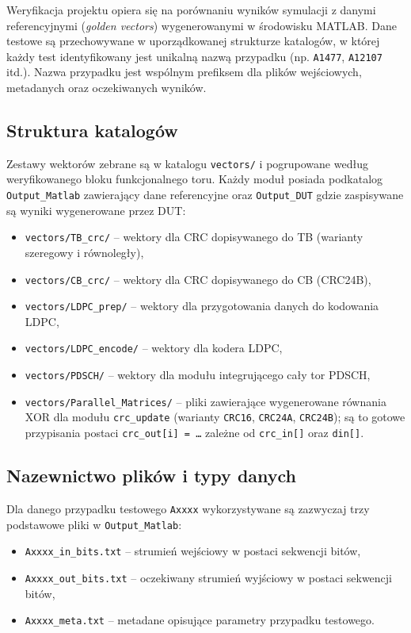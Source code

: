 Weryfikacja projektu opiera się na porównaniu wyników symulacji z danymi referencyjnymi
(\emph{golden vectors}) wygenerowanymi w środowisku MATLAB. Dane testowe są przechowywane
w uporządkowanej strukturze katalogów, w której każdy test identyfikowany jest unikalną nazwą
przypadku (np. \texttt{A1477}, \texttt{A12107} itd.). Nazwa przypadku jest wspólnym prefiksem
dla plików wejściowych, metadanych oraz oczekiwanych wyników.

\subsection{Struktura katalogów}
\label{subsec:wektory_struktura_katalogow}

Zestawy wektorów zebrane są w katalogu \texttt{vectors/} i pogrupowane według weryfikowanego bloku funkcjonalnego toru. Każdy moduł posiada podkatalog \texttt{Output\_Matlab} zawierający dane referencyjne oraz \texttt{Output\_DUT} gdzie zaspisywane są wyniki wygenerowane przez DUT:

\begin{itemize}
    \item \texttt{vectors/TB\_crc/} -- wektory dla CRC dopisywanego do TB (warianty szeregowy i równoległy),
    \item \texttt{vectors/CB\_crc/} -- wektory dla CRC dopisywanego do CB (CRC24B),
    \item \texttt{vectors/LDPC\_prep/} -- wektory dla przygotowania danych do kodowania LDPC,
    \item \texttt{vectors/LDPC\_encode/} -- wektory dla kodera LDPC,
    \item \texttt{vectors/PDSCH/} -- wektory dla modułu integrującego cały tor PDSCH,
    \item \texttt{vectors/Parallel\_Matrices/} -- pliki zawierające wygenerowane równania XOR dla modułu \texttt{crc\_update} (warianty \texttt{CRC16}, \texttt{CRC24A}, \texttt{CRC24B}); są to gotowe przypisania postaci \texttt{crc\_out[i] = \ldots} zależne od \texttt{crc\_in[]} oraz \texttt{din[]}.


\end{itemize}

\subsection{Nazewnictwo plików i typy danych}
\label{subsec:wektory_typy_plikow}

Dla danego przypadku testowego \texttt{Axxxx} wykorzystywane są zazwyczaj trzy podstawowe
pliki w \texttt{Output\_Matlab}:
\begin{itemize}
    \item \texttt{Axxxx\_in\_bits.txt} -- strumień wejściowy w postaci sekwencji bitów,
    \item \texttt{Axxxx\_out\_bits.txt} -- oczekiwany strumień wyjściowy w postaci sekwencji bitów,
    \item \texttt{Axxxx\_meta.txt} -- metadane opisujące parametry przypadku testowego.
\end{itemize}

